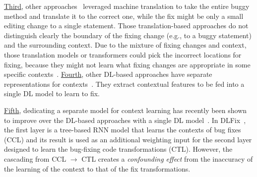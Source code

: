 \underline{Third}, other
approaches~\cite{hata2018learning,tufano2019learning,tufano2018empirical}
leveraged machine translation to take the entire buggy
method and translate it to the correct one, while the fix might be
only a small editing change to a single statement. Those
translation-based approaches do not distinguish clearly the
  boundary of the fixing change (e.g., to a buggy statement) and the
surrounding context.
Due to the mixture of fixing changes and context, those translation
models or transformers could pick the incorrect locations for fixing,
because they might not learn what fixing changes are appropriate in
some specific contexts~\cite{icse20}. \underline{Fourth}, other
DL-based approaches have separate representations for
contexts~\cite{chen2018sequencer,cure-icse21,lutellier2020coconut}.
They extract contextual features to be fed into a single DL
model to learn to fix.

\underline{Fifth}, dedicating a separate model for context learning
has recently been shown to improve over the DL-based approaches with a
single DL model~\cite{icse20}. In DLFix~\cite{icse20}, the first layer
is a tree-based RNN model that learns the contexts of bug fixes (CCL)
and its result is used as an additional weighting input for the second
layer designed to learn the bug-fixing code transformations
(CTL). However, the cascading from CCL $\rightarrow$ CTL
creates a {\em confounding effect} from the inaccuracy of the learning
of the context to that of the fix transformations.




